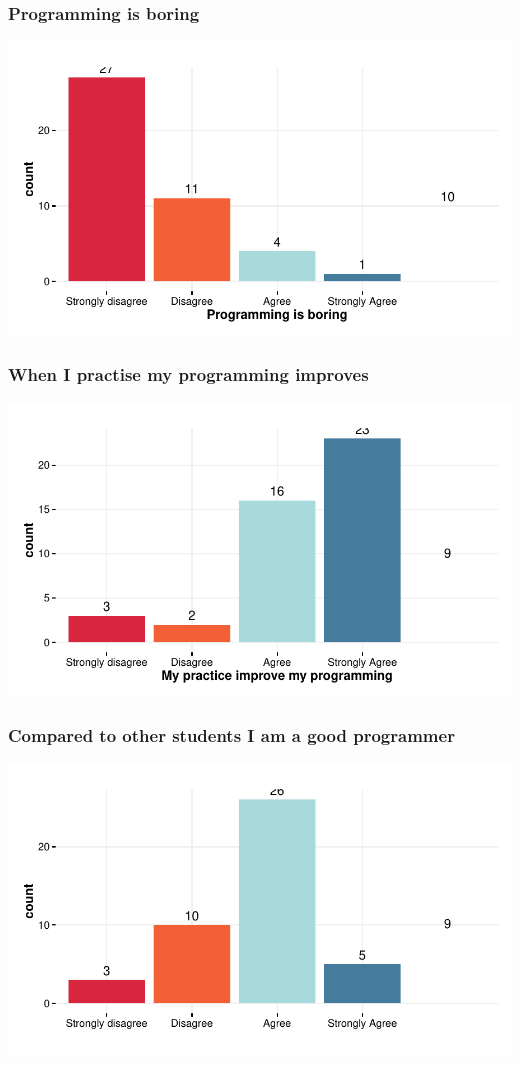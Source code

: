 \documentclass{article}
\begin{document}
\subsubsection{Programming is boring}
\includegraphics{Raw_num/plots/-plot_prog_ennuyant}

\subsubsection{When I practise my programming improves}
\includegraphics{Raw_num/plots/-plot_pratik_amel}

\subsubsection{Compared to other students I am a good programmer}
\includegraphics{Raw_num/plots/-plot_meilleur_prog}
\end{document}
